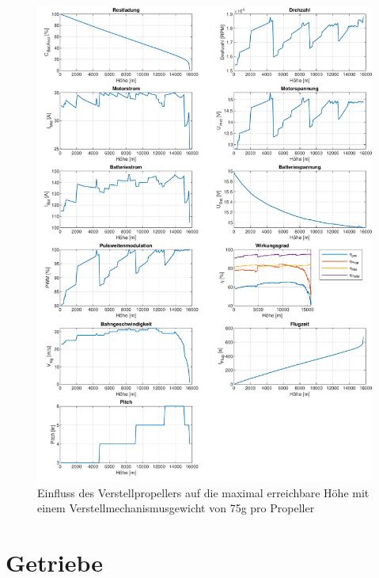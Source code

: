 \begin{appendix}
\begin{figure}[H]
\centering
	\includegraphics[scale=0.7]{Diagramme/Verstellprop_real.pdf}
	\caption{Einfluss des Verstellpropellers auf die maximal erreichbare Höhe mit einem Verstellmechanismusgewicht von 75g pro Propeller}
	\label{abb:verstellprop_real}
\end{figure}


\section{Getriebe}


\end{appendix}
